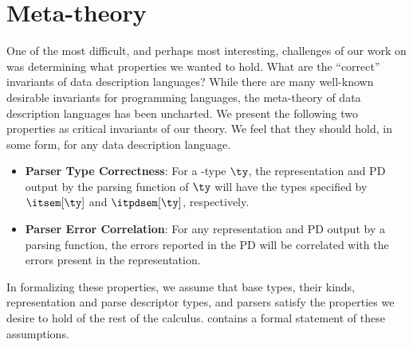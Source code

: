 \section{Meta-theory}
\label{sec:meta-theory}


One of the most difficult, and perhaps most interesting, challenges of our
work on \ddc{} was determining what
properties we wanted to hold. What are the ``correct''
invariants of data description languages? While there are many
well-known desirable invariants for programming languages, the
meta-theory of data description languages has been
uncharted.
%
We present the following two properties as critical invariants of
our theory. We feel that they should hold, in some form, for any data
description language.
\begin{itemize}
\item {\bf Parser Type Correctness}: For a \ddc{}-type $\ty$, the
  representation and PD output by the parsing function of $\ty$ will
  have the types specified by $\itsem[\ty]$ and
  $\itpdsem[\ty]$, respectively.
  
\item {\bf Parser Error Correlation}: For any representation and PD output by a
  parsing function, the errors reported in the PD
  will be correlated with the errors present in the representation.
\end{itemize}
%
In formalizing these properties, we assume that \ddc{} base types, their kinds, representation and parse descriptor types, and parsers satisfy the properties we desire to hold of the rest of the calculus.  
 contains a formal statement of these assumptions.

